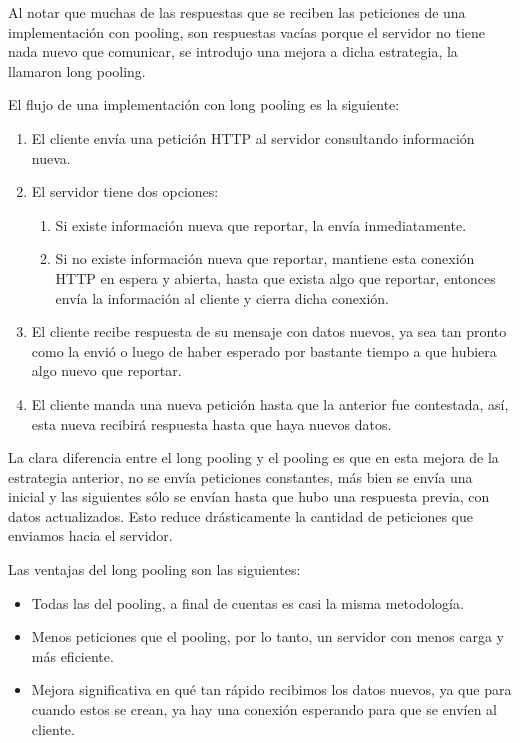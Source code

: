 Al notar que muchas de las respuestas que se reciben las peticiones de una implementación con pooling, son respuestas vacías porque el servidor no tiene nada nuevo que comunicar, se introdujo una mejora a dicha estrategia, la llamaron long pooling.

El flujo de una implementación con long pooling es la siguiente:

\begin{enumerate}
  \item El cliente envía una petición HTTP al servidor consultando información nueva.
  \item El servidor tiene dos opciones:
  \begin{enumerate}
    \item Si existe información nueva que reportar, la envía inmediatamente.
    \item Si no existe información nueva que reportar, mantiene esta conexión HTTP en espera y abierta, hasta que exista algo que reportar, entonces envía la información al cliente y cierra dicha conexión.
  \end{enumerate}
  \item El cliente recibe respuesta de su mensaje con datos nuevos, ya sea tan pronto como la envió o luego de haber esperado por bastante tiempo a que hubiera algo nuevo que reportar.
  \item El cliente manda una nueva petición hasta que la anterior fue contestada, así, esta nueva recibirá respuesta hasta que haya nuevos datos.
\end{enumerate}

La clara diferencia entre el long pooling y el pooling es que en esta mejora de la estrategia anterior, no se envía peticiones constantes, más bien se envía una inicial y las siguientes sólo se envían hasta que hubo una respuesta previa, con datos actualizados. Esto reduce drásticamente la cantidad de peticiones que enviamos hacia el servidor.

Las ventajas del long pooling son las siguientes:

\begin{itemize}
  \item Todas las del pooling, a final de cuentas es casi la misma metodología.
  \item Menos peticiones que el pooling, por lo tanto, un servidor con menos carga y más eficiente.
  \item Mejora significativa en qué tan rápido recibimos los datos nuevos, ya que para cuando estos se crean, ya hay una conexión esperando para que se envíen al cliente.
\end{itemize}

